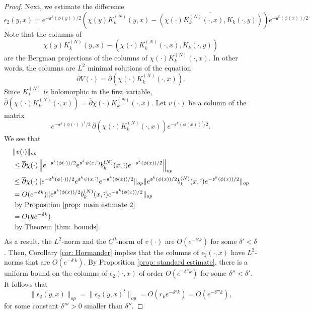 \documentclass{amsart}
\theoremstyle{definition}
\theoremstyle{remark}
\numberwithin{equation}{section}
\begin{document}
\begin{proof}
Next, we estimate the difference
$$
\epsilon_2(y,x) = e^{-\mathfrak{s}^k(\phi(y))/2} \left ( \overline{\chi(y) K_k^{(N)}(y,x)} - \overline{\left ( \chi(\cdot) K_k^{(N)}(\cdot,x), K_k(\cdot,y) \right )} \right ) e^{-\mathfrak{s}^k(\phi(x))/2}
$$
Note that the columns of
$$
\chi(y) K_k^{(N)}(y,x) - \left ( \chi(\cdot) K_k^{(N)}(\cdot,x), K_k(\cdot,y) \right )
$$
are the Bergman projections of the columns of $\chi(\cdot) K_k^{(N)}(\cdot,x)$. In other words, the columns are $L^2$ minimal solutions of the equation
$$
\overline{\partial} V(\cdot) = \overline{\partial} \left ( \chi(\cdot) K_k^{(N)}(\cdot,x ) \right ).
$$
Since $K_k^{(N)}$ is holomorphic in the first variable,
$\overline{\partial} \left ( \chi(\cdot) K_k^{(N)}(\cdot,x) \right )=\overline{\partial} \chi(\cdot) K_k^{(N)}(\cdot,x)$. Let $v(\cdot)$ be a column of the matrix 
$$
e^{-\mathfrak{s}^k(\phi(\cdot))^t/2} \, \overline{\partial} \left ( \chi(\cdot) K_k^{(N)}(\cdot,x) \right )e^{-\mathfrak{s}^k(\phi(x))^t/2}.
$$
We see that
\begin{equation*}
\begin{split}
&  \|v(\cdot)\|_{op} \\
& \leq \overline{\partial} \chi(\cdot) \left \| e^{-\mathfrak{s}^k(\phi(\cdot))/2} e^{\mathfrak{s}^k\psi(x,\overline{\cdot})}b_k^{(N)}(x,\overline{\cdot})e^{-\mathfrak{s}^k(\phi(x))/2} 
 \right \|_{op} \\
    & \leq \overline{\partial} \chi(\cdot) \| e^{-\mathfrak{s}^k(\phi(\cdot))/2} e^{\mathfrak{s}^k\psi(x,\overline{\cdot})}e^{-\mathfrak{s}^k(\phi(x))/2} \|_{op} \| e^{\mathfrak{s}^k(\phi(x))/2} b_k^{(N)}(x,\overline{\cdot})e^{-\mathfrak{s}^k(\phi(x))/2} \|_{op} \\
    & = O(e^{-\delta k}) \|e^{\mathfrak{s}^k(\phi(x))/2} b^{(N)}_k(x,\overline{\cdot}) e^{-\mathfrak{s}^k(\phi(x))/2}\|_{op} \\
    & \text{ by Proposition \ref{prop: main estimate 2}} \\
    & = O(ke^{-\delta k}) \\
    & \text{ by Theorem \ref{thm: bounds}}.
\end{split}
\end{equation*}
As a result, the $L^2$-norm and the $C^0$-norm of $v(\cdot)$ are $O(e^{-\delta' k})$ for some $\delta' < \delta$. Then, Corollary \ref{cor: Hormander} implies that the columns of $\epsilon_2(\cdot,x)$ have $L^2$-norms that are $O(e^{-\delta' k})$. By Proposition \ref{prop: standard estimate}, there is a uniform bound on the columns of $\epsilon_2(\cdot,x)$ of order $O(e^{-\delta'' k})$ for some $\delta'' < \delta'$. It follows that 
$$
\|\epsilon_2(y,x)\|_{op}= \|\epsilon_2(y,x)^t\|_{op} = O(r_ke^{-\delta'' k}) = O(e^{-\delta''' k}),
$$
for some constant $\delta''' > 0$ smaller than $\delta''$.


\end{proof}
\end{document}
